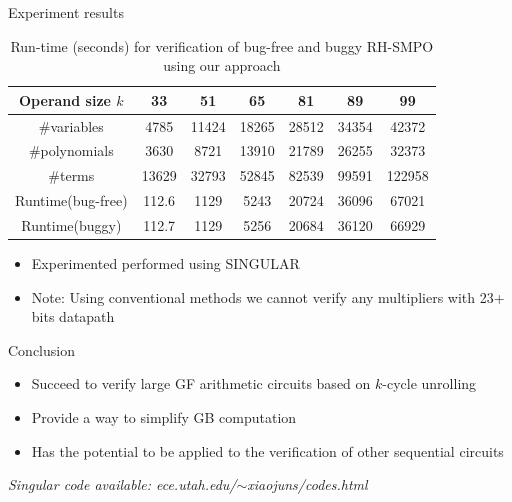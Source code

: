 \documentclass[xcolor=dvipsnames]{beamer}
\newcommand{\bi}{\begin{itemize}}
\newcommand{\ei}{\end{itemize}}
\begin{document}
\begin{frame}{\large{Experiment results}}
\begin{table}[htb]
\centering
\caption{\small Run-time (seconds) for verification of bug-free and
  buggy RH-SMPO using our approach} 
\label{tbl:exp1}  
\begin{tabular}{|c||c|c|c|c|c|c|} 
\hline
Operand size $k$ & 33 & 51 & 65 & 81 & 89 & 99\\
\hline
\#variables & 4785 & 11424 & 18265 & 28512 & 34354 & 42372\\
\hline
\#polynomials & 3630 & 8721 & 13910 & 21789 & 26255 & 32373\\
\hline
\#terms & 13629 & 32793 & 52845 & 82539 & 99591 & 122958\\
\hline
\hline
Runtime(bug-free) & 112.6 & 1129 & 5243 & 20724 & 36096 & 67021\\
\hline
Runtime(buggy) & 112.7 & 1129 & 5256 & 20684 & 36120 & 66929\\
\hline
\end{tabular}
\end{table}
\bi
\item Experimented performed using SINGULAR
\item Note: Using conventional methods we cannot verify any multipliers with 23+ bits datapath
\ei
\end{frame}


\begin{frame}{\large{Conclusion}}
\bi
\item Succeed to verify large GF arithmetic circuits based on $k$-cycle unrolling
\item Provide a way to simplify GB computation
\item Has the potential to be applied to the verification of other sequential circuits
\ei
\vspace{4cm}
\textit{Singular code available: ece.utah.edu/$\sim$xiaojuns/codes.html}
\end{frame}
\end{document}
